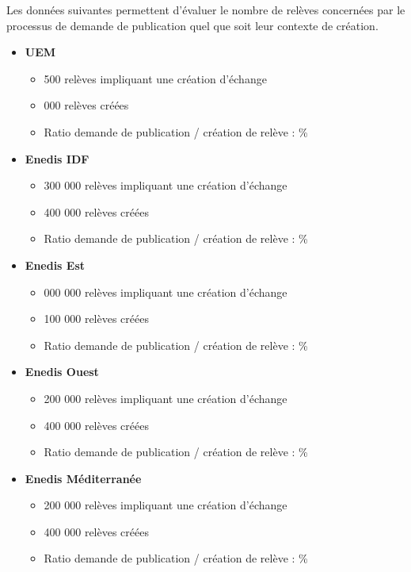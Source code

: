 \documentclass[a4paper, 12pt]{report}
\begin{document}
Les données suivantes permettent d’évaluer le nombre de relèves concernées par le processus de demande de publication quel que soit leur contexte de création.\\

\begin{itemize}
  \item \textbf{UEM}
  \begin{itemize}
    \item \approx{} 500 relèves impliquant une création d'échange
    \item \approx{} 000 relèves créées
    \item Ratio demande de publication / création de relève : \approx{}\%
  \end{itemize}
  \item \textbf{Enedis IDF}
  \begin{itemize}
    \item \approx{} 300 000 relèves impliquant une création d'échange
    \item \approx{} 400 000 relèves créées
    \item Ratio demande de publication / création de relève : \approx{}\%
  \end{itemize}
  \item \textbf{Enedis Est}
  \begin{itemize}
    \item \approx{} 000 000 relèves impliquant une création d'échange
    \item \approx{} 100 000 relèves créées
    \item Ratio demande de publication / création de relève : \approx{}\%
  \end{itemize}
  \item \textbf{Enedis Ouest}
  \begin{itemize}
    \item \approx{} 200 000 relèves impliquant une création d'échange
    \item \approx{} 400 000 relèves créées
    \item Ratio demande de publication / création de relève : \approx{}\%
  \end{itemize}
  \item \textbf{Enedis Méditerranée}
  \begin{itemize}
    \item \approx{} 200 000 relèves impliquant une création d'échange
    \item \approx{} 400 000 relèves créées
    \item Ratio demande de publication / création de relève : \approx{}\%
  \end{itemize}
\end{itemize}
\vspace{0.6cm}
\end{document}
